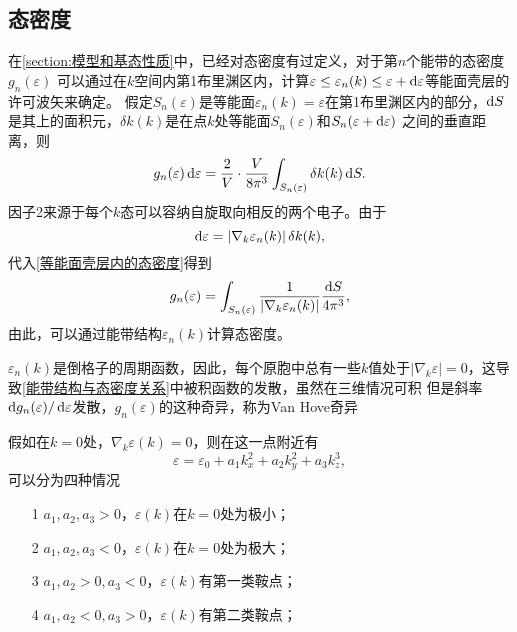             \subsection{态密度}
                在\autoref{section:模型和基态性质}中，已经对态密度有过定义，对于第$n$个能带的态密度$g_n(\varepsilon)$
                可以通过在$k$空间内第1布里渊区内，计算$\varepsilon\leq\varepsilon_n(k)\leq\varepsilon+\mathop{}\!\mathrm{d} \varepsilon$等能面壳层的许可波矢来确定。
                假定$S_n(\varepsilon)$是等能面$\varepsilon_n(k)=\varepsilon$在第1布里渊区内的部分，$\mathop{}\!\mathrm{d} S$是其上的面积元，$\delta k(k)$是在点$k$处等能面$S_n(\varepsilon)$和$S_n(\varepsilon+\mathop{}\!\mathrm{d}\varepsilon)$
                之间的垂直距离，则
                \begin{equation}
                    g_n(\varepsilon)\mathop{}\!\mathrm{d} \varepsilon=\frac{2}{V}\cdot\frac{V}{8\pi^3}\int_{S_n(\varepsilon)}^{}\delta k(k)\mathop{}\!\mathrm{d} S\label{等能面壳层内的态密度}.
                \end{equation}
                因子2来源于每个$k$态可以容纳自旋取向相反的两个电子。由于
                \begin{equation}
                    \mathop{}\!\mathrm{d}\varepsilon=\left|\nabla_k\varepsilon_n(k)\right|\delta k(k),
                \end{equation}
                代入\autoref{等能面壳层内的态密度}得到
                \begin{equation}
                    g_n(\varepsilon)=\int_{S_n(\varepsilon)}^{}\frac{1}{\left|\nabla_k\varepsilon_n(k)\right|}\frac{\mathop{}\!\mathrm{d} S}{4\pi^3}\label{能带结构与态密度关系},
                \end{equation}
                由此，可以通过能带结构$\varepsilon_n(k)$计算态密度。

                $\varepsilon_n(k)$是倒格子的周期函数，因此，每个原胞中总有一些$k$值处于$|\nabla_k\varepsilon|=0$，这导致\autoref{能带结构与态密度关系}中被积函数的发散，虽然在三维情况可积
                但是斜率$\mathop{}\!\mathrm{d} g_n(\varepsilon)/\mathop{}\!\mathrm{d} \varepsilon$发散，$g_n(\varepsilon)$的这种奇异，称为Van Hove奇异

                假如在$k=0$处，$\nabla_k\varepsilon(k)=0$，则在这一点附近有
                \begin{equation}
                    \varepsilon=\varepsilon_0+a_1k_x^2+a_2k_y^2+a_3k_z^3,
                \end{equation}
                可以分为四种情况
                \begin{itemize}
                    \item[1] $a_1,a_2,a_3>0$，$\varepsilon(k)$在$k=0$处为极小；
                    \item[2] $a_1,a_2,a_3<0$，$\varepsilon(k)$在$k=0$处为极大；
                    \item[3] $a_1,a_2>0,a_3<0$，$\varepsilon(k)$有第一类鞍点；
                    \item[4] $a_1,a_2<0,a_3>0$，$\varepsilon(k)$有第二类鞍点；
                \end{itemize}
